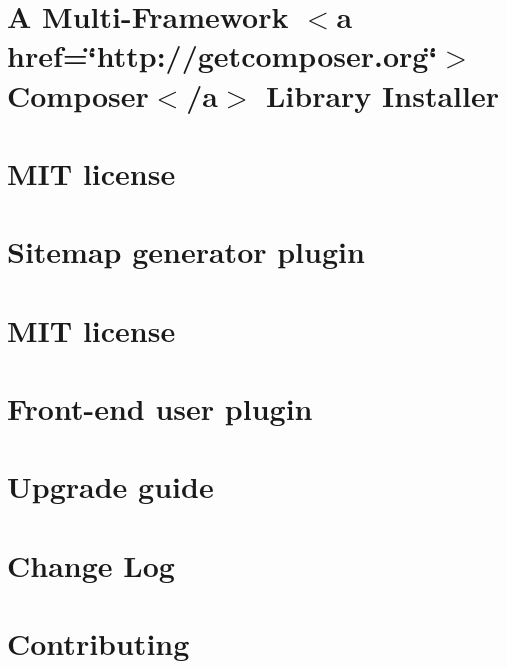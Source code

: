 \let\mypdfximage\pdfximage\def\pdfximage{\immediate\mypdfximage}\documentclass[twoside]{book}
\newcommand{\+}{\discretionary{\mbox{\scriptsize$\hookleftarrow$}}{}{}}
\begin{document}
\chapter{A Multi-\/\+Framework $<$a href=\char`\"{}http\+://getcomposer.\+org\char`\"{}$>$Composer$<$/a$>$ Library Installer}
\label{md_rainlab_location_vendor_composer_installers__r_e_a_d_m_e}

\chapter{MIT license}
\label{md_rainlab_sitemap__l_i_c_e_n_c_e}

\chapter{Sitemap generator plugin}
\label{md_rainlab_sitemap__r_e_a_d_m_e}

\chapter{MIT license}
\label{md_rainlab_user__l_i_c_e_n_c_e}

\chapter{Front-\/end user plugin}
\label{md_rainlab_user__r_e_a_d_m_e}

\chapter{Upgrade guide}
\label{md_rainlab_user__u_p_g_r_a_d_e}

\chapter{Change Log}
\label{md_rainlab_user_vendor_composer_installers__c_h_a_n_g_e_l_o_g}

\chapter{Contributing}
\label{md_rainlab_user_vendor_composer_installers__c_o_n_t_r_i_b_u_t_i_n_g}

\end{document}
